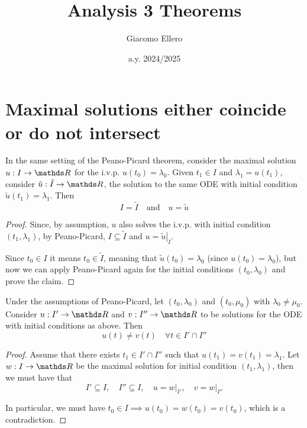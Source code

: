 \documentclass[12pt]{extarticle}
\title{Analysis 3 Theorems}
\author{Giacomo Ellero}
\date{a.y. 2024/2025}
\numberwithin{equation}{section}
\begin{document}
\section{Maximal solutions either coincide or do not intersect}

\begin{theorem}{}{}
    In the same setting of the Peano-Picard theorem,
    consider the maximal solution $u: I \to \R$
    for the i.v.p. $u(t_0) = \lambda_0$.
    Given $t_1 \in I$ and $\lambda_1 = u(t_1)$,
    consider $\tilde{u}: \tilde I \to \R$,
    the solution to the same ODE with initial condition $\tilde{u}(t_1) = \lambda_1$.
    Then
    \begin{equation}
        I = \tilde I \quad \text{and} \quad u = \tilde u
    \end{equation}
\end{theorem}

\begin{proof}
    Since, by assumption, $u$ also solves the i.v.p. with initial condition $(t_1, \lambda_1)$,
    by Peano-Picard, $I \subseteq \tilde I$ and $u = \left. \tilde u \right|_I$.

    Since $t_0 \in I$ it means $t_0 \in \tilde I$, meaning that $\tilde u(t_0) = \lambda_0$
    (since $u(t_0) = \lambda_0$), but now we can apply Peano-Picard again for the initial conditions $(t_0, \lambda_0)$
    and prove the claim.
\end{proof}


\begin{theorem}{}{}
    Under the assumptions of Peano-Picard, let $(t_0, \lambda_0)$ and $(t_0, \mu_0)$ with $\lambda_0 \ne \mu_0$.
    Consider $u: I' \to \R$ and $v: I'' \to \R$ to be solutions for the ODE with initial conditions as above.
    Then
    \begin{equation}
        u(t) \neq v(t) \quad \forall t \in I' \cap I''
    \end{equation}
\end{theorem}

\begin{proof}
    Assume that there exists $t_1 \in I' \cap I''$ such that $u(t_1) = v(t_1) = \lambda_1$.
    Let $w: I \to \R$ be the maximal solution for initial condition $(t_1, \lambda_1)$,
    then we must have that
    \begin{equation}
        I'\subseteq I, \quad I'' \subseteq I, \quad u = \left. w\right|_{I'}, \quad v = \left. w\right|_{I''}
    \end{equation}

    In particular, we must have $t_0 \in I \implies u(t_0) = w(t_0) = v(t_0)$, which is a contradiction.
\end{proof}
\end{document}
